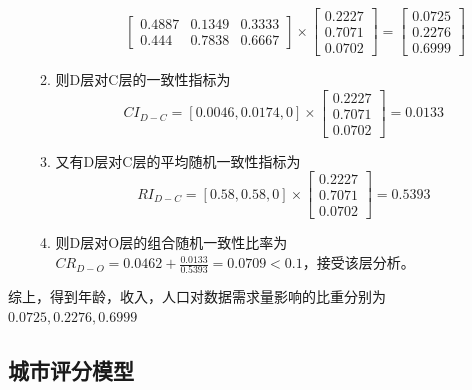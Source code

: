\documentclass[UTF8,12pt]{ctexart}
\begin{document}
\begin{enumerate}
\begin{enumerate}
\begin{itemize}
$$\begin{bmatrix}
                                      0.4887 & 0.1349 & 0.3333 \\
                                      0.444  & 0.7838 & 0.6667
                                  \end{bmatrix}×\begin{bmatrix}
                                      0.2227 \\
                                      0.7071 \\
                                      0.0702
                                  \end{bmatrix}=\begin{bmatrix}
                                      0.0725 \\
                                      0.2276 \\
                                      0.6999
                                  \end{bmatrix}$$
                    \end{itemize}
              \item 则D层对C层的一致性指标为
                    $$CI_{D-C}=[0.0046,0.0174,0]×\begin{bmatrix}
                            0.2227 \\
                            0.7071 \\
                            0.0702
                        \end{bmatrix}=0.0133$$
              \item 又有D层对C层的平均随机一致性指标为
                    $$RI_{D-C}=[0.58,0.58,0]×\begin{bmatrix}
                            0.2227 \\
                            0.7071 \\
                            0.0702
                        \end{bmatrix}=0.5393$$
              \item 则D层对O层的组合随机一致性比率为
                    $CR_{D-O}=0.0462+\displaystyle\frac{0.0133}{0.5393}=
                        0.0709<0.1$，接受该层分析。
          \end{enumerate}

\end{enumerate}
综上，得到年龄，收入，人口对数据需求量影响的比重分别为$0.0725,0.2276,0.6999$



\subsection{城市评分模型}\label{PingFen}
\end{document}
